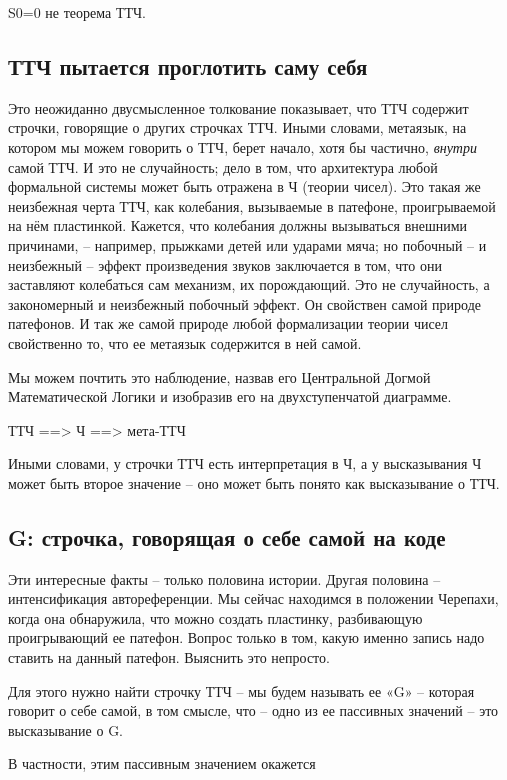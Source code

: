 \documentclass[../main.tex]{subfiles}
\begin{document}
S0=0 не теорема ТТЧ.


\subsection{ТТЧ пытается проглотить саму себя}

Это неожиданно двусмысленное толкование показывает, что ТТЧ содержит строчки, говорящие о других строчках ТТЧ. Иными словами, метаязык, на котором мы можем говорить о ТТЧ, берет начало, хотя бы частично, \emph{внутри} самой ТТЧ. И это не случайность; дело в том, что архитектура любой формальной системы может быть отражена в Ч (теории чисел). Это такая же неизбежная черта ТТЧ, как колебания, вызываемые в патефоне, проигрываемой на нём пластинкой. Кажется, что колебания должны вызываться внешними причинами, \--- например, прыжками детей или ударами мяча; но побочный \--- и неизбежный \--- эффект произведения звуков заключается в том, что они заставляют колебаться сам механизм, их порождающий. Это не случайность, а закономерный и неизбежный побочный эффект. Он свойствен самой природе патефонов. И так же самой природе любой формализации теории чисел свойственно то, что ее метаязык содержится в ней самой.

Мы можем почтить это наблюдение, назвав его Центральной Догмой Математической Логики и изобразив его на двухступенчатой диаграмме.

ТТЧ ==\textgreater{} Ч ==\textgreater{} мета-ТТЧ

Иными словами, у строчки ТТЧ есть интерпретация в Ч, а у высказывания Ч может быть второе значение \--- оно может быть понято как высказывание о ТТЧ.


\subsection{G: строчка, говорящая о себе самой на коде}

Эти интересные факты \--- только половина истории. Другая половина \--- интенсификация автореференции. Мы сейчас находимся в положении Черепахи, когда она обнаружила, что можно создать пластинку, разбивающую проигрывающий ее патефон. Вопрос только в том, какую именно запись надо ставить на данный патефон. Выяснить это непросто.

Для этого нужно найти строчку ТТЧ \--- мы будем называть ее «G» \--- которая говорит о себе самой, в том смысле, что \--- одно из ее пассивных значений \--- это высказывание о G.

В частности, этим пассивным значением окажется
\end{document}
